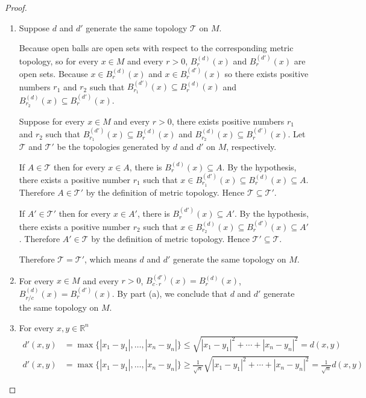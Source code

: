 \begin{proof}
	\begin{enumerate}[label={(\alph*)}]
		\item Suppose $d$ and $d'$ generate the same topology $\mathscr{T}$ on $M$.

		      Because open balls are open sets with respect to the corresponding metric topology, so for every $x\in M$ and every $r > 0$, $B^{(d)}_{r}(x)$ and $B^{(d')}_{r}(x)$ are open sets. Because $x\in B^{(d)}_{r}(x)$ and $x\in B^{(d')}_{r}(x)$ so there exists positive numbers $r_{1}$ and $r_{2}$ such that $B^{(d')}_{r_{1}}(x)\subseteq B^{(d)}_{r}(x)$ and $B^{(d)}_{r_{2}}(x)\subseteq B^{(d')}_{r}(x)$.

		      Suppose for every $x\in M$ and every $r > 0$, there exists positive numbers $r_{1}$ and $r_{2}$ such that $B^{(d')}_{r_{1}}(x)\subseteq B^{(d)}_{r}(x)$ and $B^{(d)}_{r_{2}}(x)\subseteq B^{(d')}_{r}(x)$. Let $\mathscr{T}$ and $\mathscr{T}'$ be the topologies generated by $d$ and $d'$ on $M$, respectively.

		      If $A\in\mathscr{T}$ then for every $x\in A$, there is $B^{(d)}_{r}(x)\subseteq A$. By the hypothesis, there exists a positive number $r_{1}$ such that $x\in B^{(d')}_{r_{1}}(x)\subseteq B^{(d)}_{r}(x)\subseteq A$. Therefore $A\in\mathscr{T}'$ by the definition of metric topology. Hence $\mathscr{T}\subseteq \mathscr{T}'$.

		      If $A'\in\mathscr{T}'$ then for every $x\in A'$, there is $B^{(d')}_{r}(x)\subseteq A'$. By the hypothesis, there exists a positive number $r_{2}$ such that $x\in B^{(d)}_{r_{2}}(x)\subseteq B^{(d')}_{r}(x)\subseteq A'$. Therefore $A'\in \mathscr{T}$ by the definition of metric topology. Hence $\mathscr{T}'\subseteq \mathscr{T}$.

		      Therefore $\mathscr{T} = \mathscr{T}'$, which means $d$ and $d'$ generate the same topology on $M$.
		\item For every $x\in M$ and every $r > 0$, $B^{(d')}_{c\cdot r}(x) = B^{(d)}_{r}(x)$, $B^{(d)}_{r/c}(x) = B^{(d')}_{r}(x)$. By part (a), we conclude that $d$ and $d'$ generate the same topology on $M$.
		\item For every $x, y\in \mathbb{R}^{n}$
		      \[
			      \begin{split}
				      d'(x, y) & = \max\{ \left\vert{x_{1} - y_{1}}\right\vert, \ldots, \left\vert{x_{n} - y_{n}}\right\vert \} \leq \sqrt{{\left\vert{x_{1} - y_{1}}\right\vert}^{2} + \cdots + {\left\vert{x_{n} - y_{n}}\right\vert}^{2}} = d(x, y)                                     \\
				      d'(x, y) & = \max\{ \left\vert{x_{1} - y_{1}}\right\vert, \ldots, \left\vert{x_{n} - y_{n}}\right\vert \} \geq \frac{1}{\sqrt{n}}\sqrt{{\left\vert{x_{1} - y_{1}}\right\vert}^{2} + \cdots + {\left\vert{x_{n} - y_{n}}\right\vert}^{2}} = \frac{1}{\sqrt{n}}d(x, y)
			      \end{split}
		      \]


\end{enumerate}
\end{proof}
